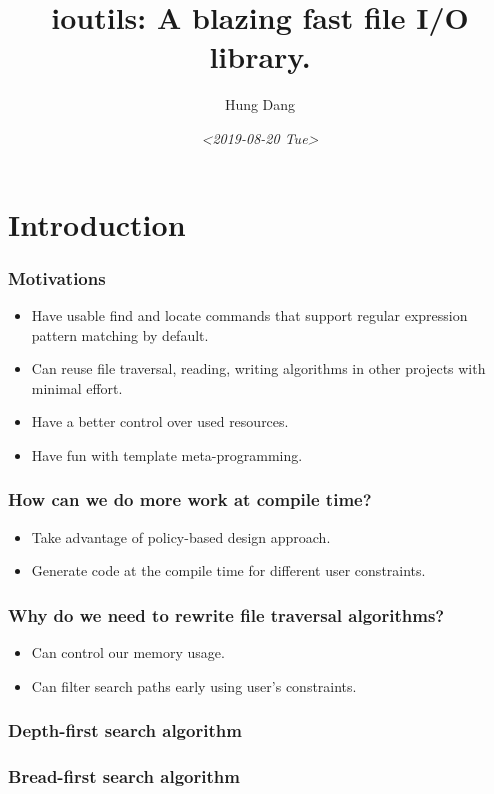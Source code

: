 \documentclass[bigger]{beamer}
\author{Hung Dang}
\date{\textit{<2019-08-20 Tue>}}
\title{ioutils: A blazing fast file I/O library.}
\begin{document}
\maketitle
\section{Introduction}
\begin{frame}
    \frametitle{Motivations}
    \begin{itemize}
    \item Have usable find and locate commands that support regular
        expression pattern matching by default.
    \item Can reuse file traversal, reading, writing algorithms in
        other projects with minimal effort.
    \item Have a better control over used resources.
    \item Have fun with template meta-programming.
    \end{itemize}
\end{frame}

\begin{frame}
    \frametitle{How can we do more work at compile time?}
    \begin{itemize}
        \item Take advantage of policy-based design approach.
        \item Generate code at the compile time for different user constraints.
    \end{itemize}
\end{frame}

\begin{frame}
    \frametitle{Why do we need to rewrite file traversal algorithms?}
    \begin{itemize}
    \item Can control our memory usage.
    \item Can filter search paths early using user's constraints.
    \end{itemize}
\end{frame}

\begin{frame}
    \frametitle{Depth-first search algorithm}
\end{frame}

\begin{frame}
    \frametitle{Bread-first search algorithm}
\end{frame}
\end{document}
